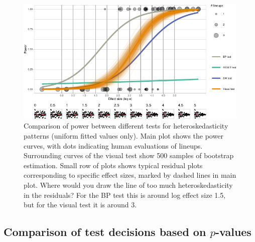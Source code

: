 \documentclass[]{interact}
\theoremstyle{plain}%
\theoremstyle{definition}
\theoremstyle{remark}
\begin{document}
\begin{figure}

{\centering \includegraphics[width=1\linewidth]{paper_comparison_files/figure-latex/heterpower-1} 

}

\caption{Comparison of power between different tests for heteroskedasticity patterns (uniform fitted values only). Main plot shows the power curves, with dots indicating human evaluations of lineups. Surrounding curves of the visual test show 500 samples of bootstrap estimation. Small row of plots shows typical residual plots corresponding to specific effect sizes, marked by dashed lines in main plot. Where would you draw the line of too much heteroskedasticity in the residuals? For the BP test this is around log effect size 1.5, but for the visual test it is around 3.}\label{fig:heterpower}
\end{figure}

\hypertarget{comparison-of-test-decisions-based-on-p-values}{%
\subsection{\texorpdfstring{Comparison of test decisions based on
\(p\)-values}{Comparison of test decisions based on p-values}}\label{comparison-of-test-decisions-based-on-p-values}}
\end{document}
